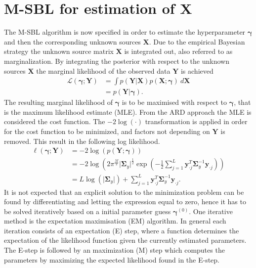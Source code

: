 \section{M-SBL for estimation of $\textbf{X}$}\label{seg:M_sblalg}
The M-SBL algorithm is now specified in order to estimate the hyperparameter $\boldsymbol{\gamma}$ and then the corresponding unknown sources $\textbf{X}$.
Due to the empirical Bayesian strategy the unknown source matrix $\mathbf{X}$ is integrated out, also referred to as marginalization.
By integrating the posterior with respect to the unknown sources $\mathbf{X}$ the marginal likelihood of the observed data $\mathbf{Y}$ is achieved \cite[p. 146]{phd_wipf} 
\begin{align*}
\mathcal{L}(\boldsymbol{\gamma};\textbf{Y}) &= \int p (\mathbf{Y} \vert \mathbf{X}) p (\mathbf{X} ; \boldsymbol{\gamma}) \ d\mathbf{X} \\
&= p (\mathbf{Y} \vert \boldsymbol{\gamma}).
\end{align*}
The resulting marginal likelihood of $\boldsymbol{\gamma}$ is to be maximised with respect to $\boldsymbol{\gamma}$, that is the maximum likelihood estimate (MLE). From the ARD approach the MLE is considered the cost function. 
The $-2 \log (\cdot)$ transformation is applied in order for the cost function to be minimized, and factors not depending on $\textbf{Y}$ is removed. This result in the following log likelihood. 
\begin{align}
\ell(\boldsymbol{\gamma};\textbf{Y})&= - 2 \log(p (\mathbf{Y} ; \boldsymbol{\gamma}))\nonumber \\ 
&= -2\log \left( 2\pi^{\frac{M}{2}}\vert \boldsymbol{\Sigma}_{y}\vert^{\frac{1}{2}}\exp \left( - \frac{1}{2} \sum_{j=1}^L \textbf{y}_{\cdot j}^T \boldsymbol{\Sigma}_{y}^{-1} \textbf{y}_{\cdot j} \right) \right)\nonumber \\
&= L \log ( \vert \boldsymbol{\Sigma}_y \vert ) + \sum_{j=1}^L \mathbf{y}_{\cdot j}^T \boldsymbol{\Sigma}_y ^{-1} \mathbf{y}_{\cdot j}.\label{eq:likelihood}
\end{align}
It is not expected that an explicit solution to the minimization problem can be found by differentiating and letting the expression equal to zero, hence it has to be solved iteratively based on a initial parameter guess $\boldsymbol{\gamma}^{(0)}$.
One iterative method is the expectation maximisation (EM) algorithm.
In general each iteration consists of an expectation (E) step, where a function determines the expectation of the likelihood function given the currently estimated parameters. The E-step is followed by an maximization (M) step which computes the parameters by maximizing the expected likelihood found in the E-step.
